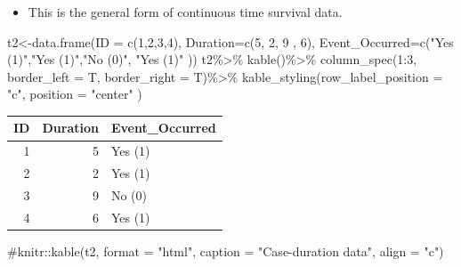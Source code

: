 \documentclass[
  letterpaper,
  DIV=11,
  numbers=noendperiod]{scrreprt}
\newenvironment{Shaded}{\begin{snugshade}}{\end{snugshade}}
\newcommand{\AttributeTok}[1]{\textcolor[rgb]{0.40,0.45,0.13}{#1}}
\newcommand{\CommentTok}[1]{\textcolor[rgb]{0.37,0.37,0.37}{#1}}
\newcommand{\DecValTok}[1]{\textcolor[rgb]{0.68,0.00,0.00}{#1}}
\newcommand{\FunctionTok}[1]{\textcolor[rgb]{0.28,0.35,0.67}{#1}}
\newcommand{\NormalTok}[1]{\textcolor[rgb]{0.00,0.23,0.31}{#1}}
\newcommand{\OtherTok}[1]{\textcolor[rgb]{0.00,0.23,0.31}{#1}}
\newcommand{\SpecialCharTok}[1]{\textcolor[rgb]{0.37,0.37,0.37}{#1}}
\newcommand{\StringTok}[1]{\textcolor[rgb]{0.13,0.47,0.30}{#1}}
\providecommand{\tightlist}{%
  \setlength{\itemsep}{0pt}\setlength{\parskip}{0pt}}\usepackage{longtable,booktabs,array}
\begin{document}
\begin{itemize}
\tightlist
\item
  This is the general form of continuous time survival data.
\end{itemize}

\begin{Shaded}
\begin{Highlighting}[]
\NormalTok{t2}\OtherTok{\textless{}{-}}\FunctionTok{data.frame}\NormalTok{(}\AttributeTok{ID =} \FunctionTok{c}\NormalTok{(}\DecValTok{1}\NormalTok{,}\DecValTok{2}\NormalTok{,}\DecValTok{3}\NormalTok{,}\DecValTok{4}\NormalTok{),}
               \AttributeTok{Duration=}\FunctionTok{c}\NormalTok{(}\DecValTok{5}\NormalTok{, }\DecValTok{2}\NormalTok{, }\DecValTok{9}\NormalTok{ , }\DecValTok{6}\NormalTok{), }
               \AttributeTok{Event\_Occurred=}\FunctionTok{c}\NormalTok{(}\StringTok{"Yes (1)"}\NormalTok{,}\StringTok{"Yes (1)"}\NormalTok{,}\StringTok{"No (0)"}\NormalTok{, }\StringTok{"Yes (1)"}\NormalTok{ ))}
\NormalTok{t2}\SpecialCharTok{\%\textgreater{}\%}
  \FunctionTok{kable}\NormalTok{()}\SpecialCharTok{\%\textgreater{}\%}
  \FunctionTok{column\_spec}\NormalTok{(}\DecValTok{1}\SpecialCharTok{:}\DecValTok{3}\NormalTok{, }\AttributeTok{border\_left =}\NormalTok{ T, }\AttributeTok{border\_right =}\NormalTok{ T)}\SpecialCharTok{\%\textgreater{}\%}
  \FunctionTok{kable\_styling}\NormalTok{(}\AttributeTok{row\_label\_position =} \StringTok{"c"}\NormalTok{, }\AttributeTok{position =} \StringTok{"center"}\NormalTok{ )}
\end{Highlighting}
\end{Shaded}

\begin{table}
\centering
\begin{tabular}{|>{}r|||>{}r|||>{}l|}
\hline
ID & Duration & Event\_Occurred\\
\hline
1 & 5 & Yes (1)\\
\hline
2 & 2 & Yes (1)\\
\hline
3 & 9 & No (0)\\
\hline
4 & 6 & Yes (1)\\
\hline
\end{tabular}
\end{table}

\begin{Shaded}
\begin{Highlighting}[]
\CommentTok{\#knitr::kable(t2, format = "html", caption = "Case{-}duration data", align = "c")}
\end{Highlighting}
\end{Shaded}
\end{document}
